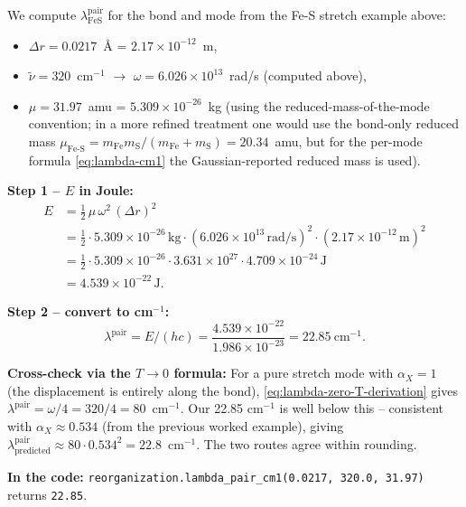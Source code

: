 \documentclass[10pt,a4paper,twoside]{article}
\newcommand{\fn}[1]{\texttt{#1}}
\begin{document}
\begin{workedexample}
We compute $\lambda_\text{FeS}^\text{pair}$ for the bond and mode
from the Fe-S stretch example above:
\begin{itemize}
  \item $\Delta r = 0.0217$~\AA{} = $2.17 \times 10^{-12}$~m,
  \item $\tilde\nu = 320$~cm$^{-1}$ $\to$
        $\omega = 6.026 \times 10^{13}$~rad/s (computed above),
  \item $\mu = 31.97$~amu = $5.309 \times 10^{-26}$~kg (using
        the reduced-mass-of-the-mode convention; in a more refined
        treatment one would use the bond-only reduced mass
        $\mu_\text{Fe-S} = m_\text{Fe} m_\text{S} / (m_\text{Fe} +
        m_\text{S}) = 20.34$~amu, but for the per-mode formula
        \cref{eq:lambda-cm1} the Gaussian-reported reduced mass is
        used).
\end{itemize}

\textbf{Step 1 -- $E$ in Joule:}
\begin{align*}
  E &= \tfrac{1}{2}\,\mu\,\omega^2\,(\Delta r)^2 \\
    &= \tfrac{1}{2} \cdot 5.309 \times 10^{-26}\,\text{kg}
       \cdot (6.026 \times 10^{13}\,\text{rad/s})^2
       \cdot (2.17 \times 10^{-12}\,\text{m})^2 \\
    &= \tfrac{1}{2} \cdot 5.309 \times 10^{-26}
       \cdot 3.631 \times 10^{27}
       \cdot 4.709 \times 10^{-24}\,\text{J} \\
    &= 4.539 \times 10^{-22}\,\text{J}.
\end{align*}

\textbf{Step 2 -- convert to cm$^{-1}$:}
\[
  \lambda^\text{pair} = E / (hc)
   = \frac{4.539 \times 10^{-22}}{1.986 \times 10^{-23}}
   = \boxed{22.85~\text{cm}^{-1}}.
\]

\textbf{Cross-check via the $T \to 0$ formula:}
For a pure stretch mode with $\alpha_X = 1$ (the displacement is
entirely along the bond), \cref{eq:lambda-zero-T-derivation} gives
$\lambda^\text{pair} = \omega/4 = 320/4 = 80$~cm$^{-1}$. Our 22.85
cm$^{-1}$ is well below this -- consistent with $\alpha_X
\approx 0.534$ (from the previous worked example), giving
$\lambda^\text{pair}_{\text{predicted}} \approx
80 \cdot 0.534^2 = 22.8$~cm$^{-1}$. The two routes agree
within rounding.

\textbf{In the code:}
\fn{reorganization.lambda\_pair\_cm1(0.0217, 320.0, 31.97)} returns
\texttt{22.85}.
\end{workedexample}
\end{document}
